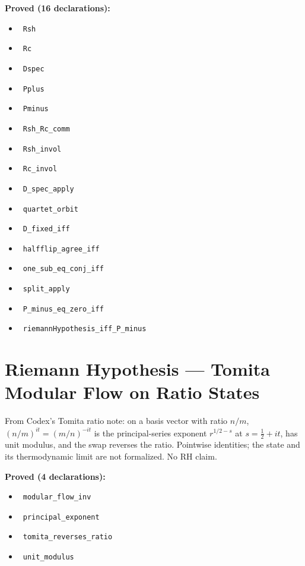 \documentclass{report}
\theoremstyle{definition}
\begin{document}
\noindent\textbf{Proved (16 declarations):}
\begin{itemize}
  \item {}\leanok\ \texttt{Rsh}
  \item {}\leanok\ \texttt{Rc}
  \item {}\leanok\ \texttt{Dspec}
  \item {}\leanok\ \texttt{Pplus}
  \item {}\leanok\ \texttt{Pminus}
  \item {}\leanok\ \texttt{Rsh\_Rc\_comm}
  \item {}\leanok\ \texttt{Rsh\_invol}
  \item {}\leanok\ \texttt{Rc\_invol}
  \item {}\leanok\ \texttt{D\_spec\_apply}
  \item {}\leanok\ \texttt{quartet\_orbit}
  \item {}\leanok\ \texttt{D\_fixed\_iff}
  \item {}\leanok\ \texttt{halfflip\_agree\_iff}
  \item {}\leanok\ \texttt{one\_sub\_eq\_conj\_iff}
  \item {}\leanok\ \texttt{split\_apply}
  \item {}\leanok\ \texttt{P\_minus\_eq\_zero\_iff}
  \item {}\leanok\ \texttt{riemannHypothesis\_iff\_P\_minus}
\end{itemize}

\section{Riemann Hypothesis --- Tomita Modular Flow on Ratio States}
From Codex's Tomita ratio note: on a basis vector with ratio $n/m$, $(n/m)^{it}=(m/n)^{-it}$ is the principal-series exponent $r^{1/2-s}$ at $s=\tfrac12+it$, has unit modulus, and the swap reverses the ratio. Pointwise identities; the state and its thermodynamic limit are not formalized. No RH claim.

\noindent\textbf{Proved (4 declarations):}
\begin{itemize}
  \item {}\leanok\ \texttt{modular\_flow\_inv}
  \item {}\leanok\ \texttt{principal\_exponent}
  \item {}\leanok\ \texttt{tomita\_reverses\_ratio}
  \item {}\leanok\ \texttt{unit\_modulus}
\end{itemize}
\end{document}
